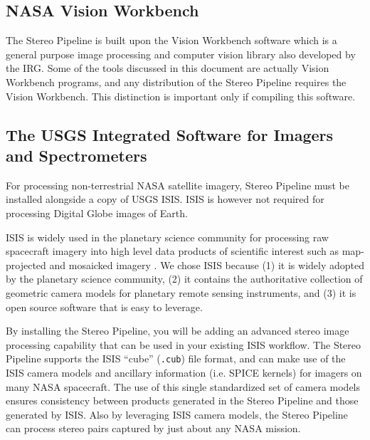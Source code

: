 \subsection{NASA Vision Workbench}

The Stereo Pipeline is built upon the Vision Workbench software
which is a general purpose image processing and computer vision
library also developed by the \ac{IRG}.  Some of the tools discussed
in this document are actually Vision Workbench programs, and any
distribution of the Stereo Pipeline requires the Vision Workbench.
This distinction is important only if compiling this software.

\subsection{The USGS Integrated Software for Imagers and Spectrometers}

For processing non-terrestrial NASA satellite imagery, Stereo Pipeline
must be installed alongside a copy of \ac{USGS} \ac{ISIS}. \ac{ISIS} is
however not required for processing Digital Globe images of Earth.

\ac{ISIS} is widely used in the planetary science community
for processing raw spacecraft imagery into high level data products of
scientific interest such as map-projected and mosaicked imagery
\cite{2004LPI....35.2039A, 1997LPI....28..387G, ISIS_website}.  We
chose \ac{ISIS} because (1) it is widely adopted by the planetary
science community, (2) it contains the authoritative collection of
geometric camera models for planetary remote sensing instruments, and
(3) it is open source software that is easy to leverage.

By installing the Stereo Pipeline, you will be adding an advanced
stereo image processing capability that can be used in your existing
\ac{ISIS} workflow.  The Stereo Pipeline supports the \ac{ISIS}
``cube'' (\texttt{.cub}) file format, and can make use of the \ac{ISIS}
camera models and ancillary information (i.e. SPICE kernels) for
imagers on many \ac{NASA} spacecraft.  The use of this single standardized
set of camera models ensures consistency between products generated
in the Stereo Pipeline and those generated by \ac{ISIS}.  Also by
leveraging \ac{ISIS} camera models, the Stereo Pipeline can process
stereo pairs captured by just about any \ac{NASA} mission.


%
%
%
%

